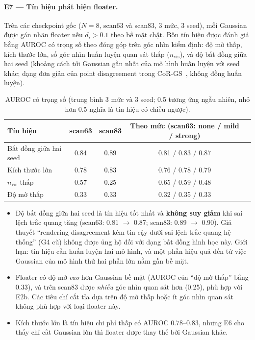 \documentclass[11pt,a4paper]{article}
\begin{document}
\paragraph{E7 --- Tín hiệu phát hiện floater.} Trên các checkpoint gốc ($N=8$, scan63 và scan83, 3 mức, 3 seed), mỗi Gaussian được gán nhãn floater nếu $d_i>0.1$ theo bề mặt chặt. Bốn tín hiệu được đánh giá bằng AUROC có trọng số theo đóng góp trên góc nhìn kiểm định: độ mờ thấp, kích thước lớn, số góc nhìn huấn luyện quan sát thấp ($n_{\text{vis}}$), và độ bất đồng giữa hai seed (khoảng cách tới Gaussian gần nhất của mô hình huấn luyện với seed khác; dạng đơn giản của point disagreement trong CoR-GS~\cite{corgs}, không đồng huấn luyện).
\begin{table}[H]
\centering\small
\caption{AUROC có trọng số (trung bình 3 mức và 3 seed; 0.5 tương ứng ngẫu nhiên, nhỏ hơn 0.5 nghĩa là tín hiệu có chiều ngược).}
\begin{tabular}{@{}lcccc@{}}
\toprule
Tín hiệu & scan63 & scan83 & Theo mức (scan63: none / mild / strong) \\
\midrule
Bất đồng giữa hai seed & 0.84 & 0.89 & 0.81 / 0.83 / 0.87 \\
Kích thước lớn & 0.78 & 0.83 & 0.76 / 0.78 / 0.79 \\
$n_{\text{vis}}$ thấp & 0.57 & 0.25 & 0.65 / 0.59 / 0.48 \\
Độ mờ thấp & 0.33 & 0.33 & 0.32 / 0.35 / 0.33 \\
\bottomrule
\end{tabular}
\end{table}
\begin{itemize}
  \item Độ bất đồng giữa hai seed là tín hiệu tốt nhất và \textbf{không suy giảm} khi sai lệch trắc quang tăng (scan63: 0.81 $\to$ 0.87; scan83: 0.89 $\to$ 0.90). Giả thuyết ``rendering disagreement kém tin cậy dưới sai lệch trắc quang hệ thống'' (G4 cũ) không được ủng hộ đối với dạng bất đồng hình học này. Giới hạn: tín hiệu cần huấn luyện hai mô hình, và một phần hiệu quả đến từ việc Gaussian của mô hình thứ hai phần lớn nằm gần bề mặt.
  \item Floater có độ mờ \emph{cao} hơn Gaussian bề mặt (AUROC của ``độ mờ thấp'' bằng 0.33), và trên scan83 được \emph{nhiều} góc nhìn quan sát hơn (0.25), phù hợp với E2b. Các tiêu chí cắt tỉa dựa trên độ mờ thấp hoặc ít góc nhìn quan sát không phù hợp với loại floater này.
  \item Kích thước lớn là tín hiệu chi phí thấp có AUROC 0.78--0.83, nhưng E6 cho thấy chỉ cắt Gaussian lớn thì floater được thay thế bởi Gaussian khác.
\end{itemize}
\end{document}
